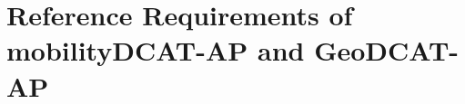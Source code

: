 \clearpage
\appendix
\section{Reference Requirements of mobilityDCAT-AP and GeoDCAT-AP}\label{app:references}

\makeatletter
\def\LT@makecaption#1#2#3{\LT@mcol\LT@cols c{\hbox to\z@{\hss\parbox[t]\LTcapwidth{\small{\bfseries #2.} #3\par\vskip\abovecaptionskip}\hss}}}
\makeatother
